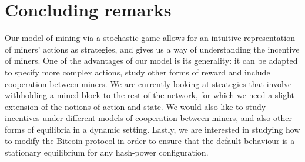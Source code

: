 \section{Concluding remarks}
\label{sec-con-r}

Our model of mining via a stochastic game allows for an intuitive representation of miners' actions as strategies, 
and gives us a way of understanding the incentive of miners. 
One of the advantages of our model is its generality: it can be adapted to specify more complex 
actions, study other forms of reward and include cooperation between miners. 
We are currently looking at strategies that involve withholding 
a mined block to the rest of the network, for which we need a slight extension of the notions of action and state. 
We would also like to study incentives under different models of cooperation between miners, and 
also other forms of equilibria in a dynamic setting. 
Lastly, we are interested in studying how to modify the Bitcoin protocol in order to ensure that the default behaviour is a 
stationary equilibrium for any hash-power configuration. 
